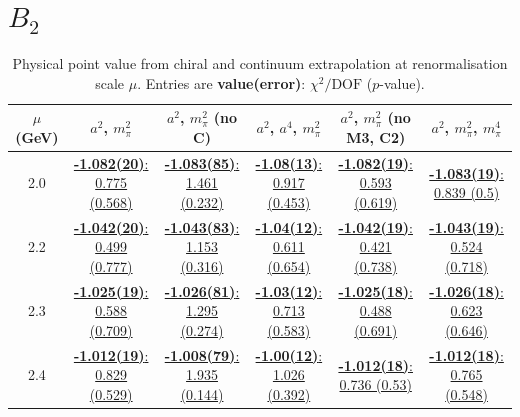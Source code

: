 \documentclass[12pt]{extarticle}
\begin{document}
\section{$B_2$}
\begin{table}[h!]
\begin{center}
\begin{tabular}{|c|c|c|c|c|c|}
\hline
$\mu$ (GeV) & $a^2$, $m_\pi^2$& $a^2$, $m_\pi^2$ (no C)& $a^2$, $a^4$, $m_\pi^2$& $a^2$, $m_\pi^2$ (no M3, C2)& $a^2$, $m_\pi^2$, $m_\pi^4$\\
\hline
2.0& \hyperlink{VVmAA/NPR/a2m2_20.pdf.1}{\textbf{-1.082(20)}: 0.775 (0.568)} & \hyperlink{VVmAA/NPR/a2m2noC_20.pdf.1}{\textbf{-1.083(85)}: 1.461 (0.232)} & \hyperlink{VVmAA/NPR/a2a4m2_20.pdf.1}{\textbf{-1.08(13)}: 0.917 (0.453)} & \hyperlink{VVmAA/NPR/a2m2mcut_20.pdf.1}{\textbf{-1.082(19)}: 0.593 (0.619)} & \hyperlink{VVmAA/NPR/a2m2m4_20.pdf.1}{\textbf{-1.083(19)}: 0.839 (0.5)}\\
2.2& \hyperlink{VVmAA/NPR/a2m2_22.pdf.1}{\textbf{-1.042(20)}: 0.499 (0.777)} & \hyperlink{VVmAA/NPR/a2m2noC_22.pdf.1}{\textbf{-1.043(83)}: 1.153 (0.316)} & \hyperlink{VVmAA/NPR/a2a4m2_22.pdf.1}{\textbf{-1.04(12)}: 0.611 (0.654)} & \hyperlink{VVmAA/NPR/a2m2mcut_22.pdf.1}{\textbf{-1.042(19)}: 0.421 (0.738)} & \hyperlink{VVmAA/NPR/a2m2m4_22.pdf.1}{\textbf{-1.043(19)}: 0.524 (0.718)}\\
2.3& \hyperlink{VVmAA/NPR/a2m2_23.pdf.1}{\textbf{-1.025(19)}: 0.588 (0.709)} & \hyperlink{VVmAA/NPR/a2m2noC_23.pdf.1}{\textbf{-1.026(81)}: 1.295 (0.274)} & \hyperlink{VVmAA/NPR/a2a4m2_23.pdf.1}{\textbf{-1.03(12)}: 0.713 (0.583)} & \hyperlink{VVmAA/NPR/a2m2mcut_23.pdf.1}{\textbf{-1.025(18)}: 0.488 (0.691)} & \hyperlink{VVmAA/NPR/a2m2m4_23.pdf.1}{\textbf{-1.026(18)}: 0.623 (0.646)}\\
2.4& \hyperlink{VVmAA/NPR/a2m2_24.pdf.1}{\textbf{-1.012(19)}: 0.829 (0.529)} & \hyperlink{VVmAA/NPR/a2m2noC_24.pdf.1}{\textbf{-1.008(79)}: 1.935 (0.144)} & \hyperlink{VVmAA/NPR/a2a4m2_24.pdf.1}{\textbf{-1.00(12)}: 1.026 (0.392)} & \hyperlink{VVmAA/NPR/a2m2mcut_24.pdf.1}{\textbf{-1.012(18)}: 0.736 (0.53)} & \hyperlink{VVmAA/NPR/a2m2m4_24.pdf.1}{\textbf{-1.012(18)}: 0.765 (0.548)}\\
\hline
\end{tabular}
\caption{Physical point value from chiral and continuum extrapolation at renormalisation scale $\mu$. Entries are \textbf{value(error)}: $\chi^2/\text{DOF}$ ($p$-value).}
\end{center}
\end{table}
\end{document}
